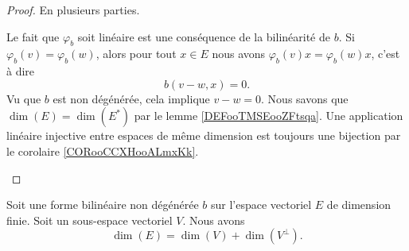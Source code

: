 \begin{proof}
	En plusieurs parties.
	\begin{subproof}
		\spitem[Linéaire]

		Le fait que \( \varphi_b\) soit linéaire est une conséquence de la bilinéarité de \( b\).
		\spitem[Injectif]
		Si \( \varphi_b(v)=\varphi_b(w)\), alors pour tout \( x\in E\) nous avons \( \varphi_b(v)x=\varphi_b(w)x\), c'est à dire
		\begin{equation}
			b(v-w,x)=0.
		\end{equation}
		Vu que \( b\) est non dégénérée, cela implique \( v-w=0\).
		\spitem[Isomorphisme]
		Nous savons que \( \dim(E)=\dim(E^*)\) par le lemme \ref{DEFooTMSEooZFtsqa}. Une application linéaire injective entre espaces de même dimension est toujours une bijection par le corolaire \ref{CORooCCXHooALmxKk}.
	\end{subproof}

\end{proof}

\begin{lemma}		\label{LEMooRXMMooAvvOjF}
	Soit une forme bilinéaire non dégénérée \( b\) sur l'espace vectoriel \( E\) de dimension finie. Soit un sous-espace vectoriel \( V\). Nous avons
	\begin{equation}		\label{EQooLFJBooNNIHgP}
		\dim(E)=\dim(V)+\dim(V^{\perp}).
	\end{equation}
\end{lemma}

